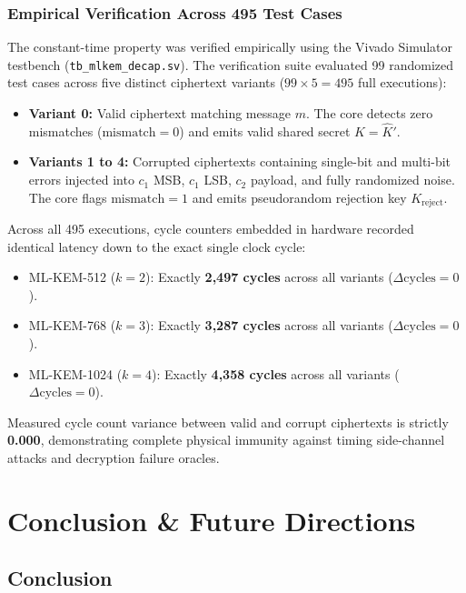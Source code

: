 \subsubsection{Empirical Verification Across 495 Test Cases}
The constant-time property was verified empirically using the Vivado Simulator testbench (\texttt{tb\_mlkem\_decap.sv}). The verification suite evaluated 99 randomized test cases across five distinct ciphertext variants ($99 \times 5 = 495$ full executions):
\begin{itemize}
    \item \textbf{Variant 0:} Valid ciphertext matching message $m$. The core detects zero mismatches ($\text{mismatch} = 0$) and emits valid shared secret $K = \hat{K}'$.
    \item \textbf{Variants 1 to 4:} Corrupted ciphertexts containing single-bit and multi-bit errors injected into $c_1$ MSB, $c_1$ LSB, $c_2$ payload, and fully randomized noise. The core flags $\text{mismatch} = 1$ and emits pseudorandom rejection key $K_{\text{reject}}$.
\end{itemize}

Across all 495 executions, cycle counters embedded in hardware recorded identical latency down to the exact single clock cycle:
\begin{itemize}
    \item ML-KEM-512 ($k = 2$): Exactly \textbf{2,497 cycles} across all variants ($\Delta \text{cycles} = 0$).
    \item ML-KEM-768 ($k = 3$): Exactly \textbf{3,287 cycles} across all variants ($\Delta \text{cycles} = 0$).
    \item ML-KEM-1024 ($k = 4$): Exactly \textbf{4,358 cycles} across all variants ($\Delta \text{cycles} = 0$).
\end{itemize}
Measured cycle count variance between valid and corrupt ciphertexts is strictly \textbf{0.000}, demonstrating complete physical immunity against timing side-channel attacks and decryption failure oracles.

\section{Conclusion \& Future Directions}
\label{sec:conclusion}

\subsection{Conclusion}
\label{sec:conclusion_summary}

